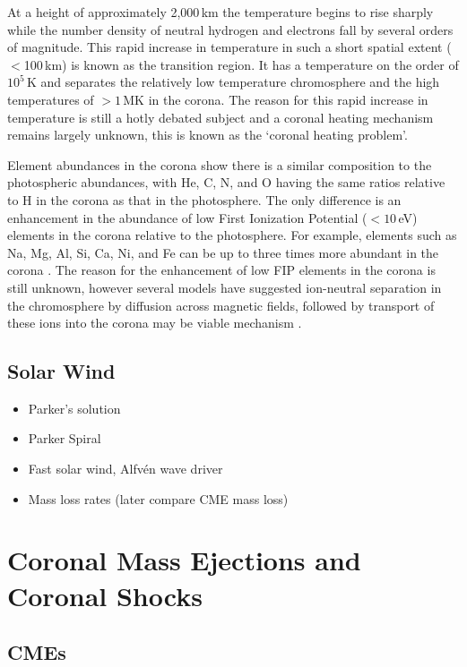 At a height of approximately 2,000\,km the temperature begins to rise sharply while the number density of neutral hydrogen and electrons fall by several orders of magnitude. This rapid increase in temperature in such a short spatial extent ($<$100\,km) is known as the transition region. It has a temperature on the order of $10^5$\,K and separates the relatively low temperature chromosphere and the high temperatures of $>1$\,MK in the corona. The reason for this rapid increase in temperature is still a hotly debated subject and a coronal heating mechanism remains largely unknown, this is known as the  \textquoteleft coronal heating problem'.


Element abundances in the corona show there is a similar composition to the photospheric abundances, with He, C, N, and O having the same ratios relative to H in the corona as that in the photosphere. The only difference is an enhancement in the abundance of low First Ionization Potential ($<10$\,eV) elements in the corona relative to the photosphere. For example, elements such as Na, Mg, Al, Si, Ca, Ni, and Fe can be up to three times more abundant in the corona \citep{feldman2003}. The reason for the enhancement of low FIP elements in the corona is still unknown, however several models have suggested ion-neutral separation in the chromosphere by diffusion across magnetic fields, followed by transport of these ions into the corona may be viable mechanism \citep{geiss1985}. 


\subsection{Solar Wind}\label{sec:13}

\begin{itemize}
\item Parker's solution
\item Parker Spiral
\item Fast solar wind, Alfv\'{e}n wave driver
\item Mass loss rates (later compare CME mass loss)
\end{itemize}



\section{Coronal Mass Ejections and Coronal Shocks}\label{sec:2}

\subsection{CMEs}\label{sec:20}


